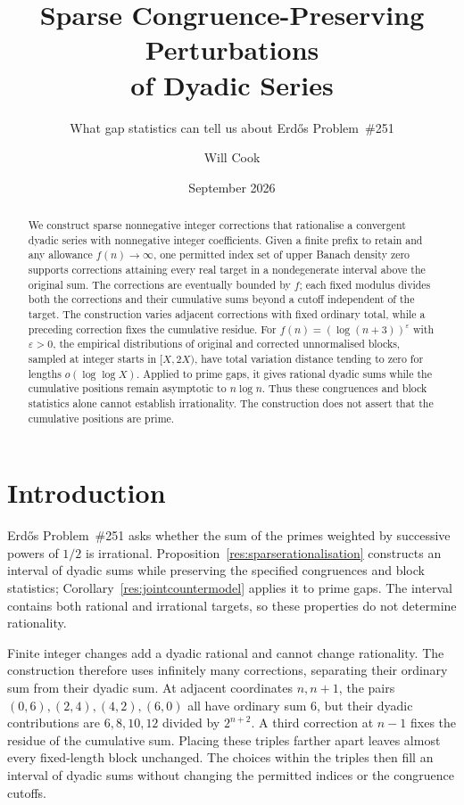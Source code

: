 \documentclass[11pt]{article}
\title{Sparse Congruence-Preserving Perturbations\\of Dyadic Series}
\subtitle{What gap statistics can tell us about Erd\H{o}s Problem~\#251}
\author{Will Cook}
\date{September 2026}
\begin{document}
\maketitle
\noteprovenance

\begin{abstract}
We construct sparse nonnegative integer corrections that rationalise a
convergent dyadic series with nonnegative integer coefficients.  Given a
finite prefix to retain and any allowance $f(n)\to\infty$, one permitted
index set of upper Banach density zero supports corrections attaining
every real target in a nondegenerate interval above the original sum.
The corrections are eventually bounded by $f$; each fixed modulus divides
both the corrections and their cumulative sums beyond a cutoff independent
of the target.  The construction varies adjacent corrections with fixed
ordinary total, while a preceding correction fixes the cumulative residue.
For $f(n)=(\log(n+3))^\varepsilon$ with $\varepsilon>0$, the empirical
distributions of original and corrected unnormalised blocks, sampled at
integer starts in $[X,2X)$, have total variation distance tending to zero
for lengths $o(\log\log X)$.  Applied to prime gaps, it gives
rational dyadic sums while the cumulative positions remain asymptotic to
$n\log n$.  Thus these congruences and block statistics alone cannot
establish irrationality.  The construction does not assert that the
cumulative positions are prime.
\end{abstract}

\section{Introduction}\label{sec:problem}

Erd\H{o}s Problem~\#251 asks whether the sum of the primes weighted by
successive powers of $1/2$ is irrational.  Proposition~\ref{res:sparserationalisation}
constructs an interval of dyadic sums while preserving the specified
congruences and block statistics; Corollary~\ref{res:jointcountermodel}
applies it to prime gaps.  The interval contains both rational and
irrational targets, so these properties do not determine rationality.

Finite integer changes add a dyadic rational and cannot change
rationality.  The construction therefore uses infinitely many corrections,
separating their ordinary sum from their dyadic sum.  At adjacent coordinates
$n,n+1$, the pairs $(0,6),(2,4),(4,2),(6,0)$ all have ordinary sum $6$,
but their dyadic contributions are $6,8,10,12$ divided by $2^{n+2}$.
A third correction at $n-1$ fixes the residue of the cumulative sum.
Placing these triples farther apart leaves almost every fixed-length
block unchanged.  The choices within the triples then fill an
interval of dyadic sums without changing the permitted indices or the
congruence cutoffs.
\end{document}
